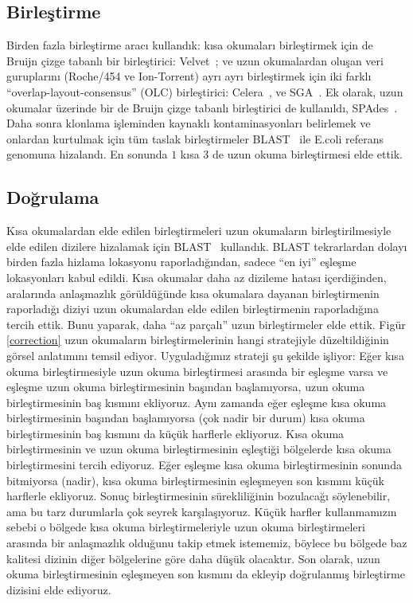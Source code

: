 \documentclass[12pt,a4paper]{cibb}
\begin{document}
\subsection{Birleştirme} Birden fazla birleştirme aracı kullandık: kısa okumaları birleştirmek için de Bruijn çizge tabanlı bir birleştirici: Velvet~\cite{velvetZerbino:2008}; ve uzun okumalardan oluşan veri guruplarını (Roche/454 ve Ion-Torrent) ayrı ayrı birleştirmek için iki farklı ``overlap-layout-consensus'' (OLC) birleştirici: Celera~\cite{celera:2000}, ve SGA~\cite{sga:2012}. Ek olarak, uzun okumalar üzerinde bir de Bruijn çizge tabanlı birleştirici de kullanıldı, SPAdes~\cite{spadesBankevich:2012}. Daha sonra klonlama işleminden kaynaklı kontaminasyonları belirlemek ve onlardan kurtulmak için tüm taslak birleştirmeler BLAST~\cite{blast} ile E.coli referans genomuna hizalandı. En sonunda $1$ kısa $3$ de uzun okuma birleştirmesi elde ettik.
 
\subsection{Doğrulama} 
Kısa okumalardan elde edilen birleştirmeleri uzun okumaların birleştirilmesiyle elde edilen dizilere hizalamak için BLAST~\cite{blast} kullandık.
BLAST tekrarlardan dolayı birden fazla hizlama lokasyonu raporladığından, sadece ``en iyi'' eşleşme lokasyonları kabul edildi.
Kısa okumalar daha az dizileme hatası içerdiğinden, aralarında anlaşmazlık görüldüğünde kısa okumalara dayanan birleştirmenin raporladığı diziyi uzun okumalardan elde edilen birleştirmenin raporladığına tercih ettik.
Bunu yaparak, daha ``az parçalı'' uzun birleştirmeler elde ettik. Figür \ref{correction} uzun okumaların birleştirmelerinin hangi stratejiyle düzeltildiğinin görsel anlatımını temsil ediyor. 
Uyguladığımız strateji şu şekilde işliyor: Eğer kısa okuma birleştirmesiyle uzun okuma birleştirmesi arasında bir eşleşme varsa ve eşleşme uzun okuma birleştirmesinin başından başlamıyorsa, uzun okuma birleştirmesinin baş kısmını ekliyoruz.
Aynı zamanda eğer eşleşme kısa okuma birleştirmesinin başından başlamıyorsa (çok nadir bir durum) kısa okuma birleştirmesinin baş kısmını da küçük harflerle ekliyoruz. 
Kısa okuma birleştirmesinin ve uzun okuma birleştirmesinin eşleştiği bölgelerde kısa okuma birleştirmesini tercih ediyoruz. 
Eğer eşleşme kısa okuma birleştirmesinin sonunda bitmiyorsa (nadir), kısa okuma birleştirmesinin eşleşmeyen son kısmını küçük harflerle ekliyoruz.
Sonuç birleştirmesinin sürekliliğinin bozulacağı söylenebilir, ama bu tarz durumlarla çok seyrek karşılaşıyoruz.
Küçük harfler kullanmamızın sebebi o bölgede kısa okuma birleştirmeleriyle uzun okuma birleştirmeleri arasında bir anlaşmazlık olduğunu takip etmek istememiz, böylece bu bölgede baz kalitesi dizinin diğer bölgelerine göre daha düşük olacaktır.
Son olarak, uzun okuma birleştirmesinin eşleşmeyen son kısmını da ekleyip doğrulanmış birleştirme dizisini elde ediyoruz.  
\end{document}
